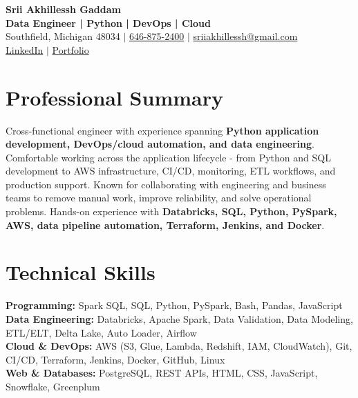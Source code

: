 \documentclass[letterpaper,10pt]{article}
\begin{document}
\fontsize{9.35pt}{10.45pt}\selectfont

\begin{center}
    {\LARGE \textbf{Srii Akhillessh Gaddam}} \\[-1pt]
    \textbf{Data Engineer | Python | DevOps | Cloud} \\[2pt]
    Southfield, Michigan 48034 $|$
    \href{tel:6468752400}{646-875-2400} $|$
    \href{mailto:sriiakhillessh@gmail.com}{sriiakhillessh@gmail.com} \\[1pt]
    \href{https://www.linkedin.com/in/srii-akhiilessh-gaddam-b48668191/}{LinkedIn} $|$
    \href{https://sriiakhillesshg.github.io/portfolio/}{Portfolio}
\end{center}
\vspace{-8pt}

\section{Professional Summary}
\small{Cross-functional engineer with experience spanning \textbf{Python application development, DevOps/cloud automation, and data engineering}. Comfortable working across the application lifecycle - from Python and SQL development to AWS infrastructure, CI/CD, monitoring, ETL workflows, and production support. Known for collaborating with engineering and business teams to remove manual work, improve reliability, and solve operational problems. Hands-on experience with \textbf{Databricks, SQL, Python, PySpark, AWS, data pipeline automation, Terraform, Jenkins, and Docker}.}

\section{Technical Skills}
\small{
\textbf{Programming:} Spark SQL, SQL, Python, PySpark, Bash, Pandas, JavaScript \\
\textbf{Data Engineering:} Databricks, Apache Spark, Data Validation, Data Modeling, ETL/ELT, Delta Lake, Auto Loader, Airflow \\
\textbf{Cloud \& DevOps:} AWS (S3, Glue, Lambda, Redshift, IAM, CloudWatch), Git, CI/CD, Terraform, Jenkins, Docker, GitHub, Linux \\
\textbf{Web \& Databases:} PostgreSQL, REST APIs, HTML, CSS, JavaScript, Snowflake, Greenplum
}

\end{document}
